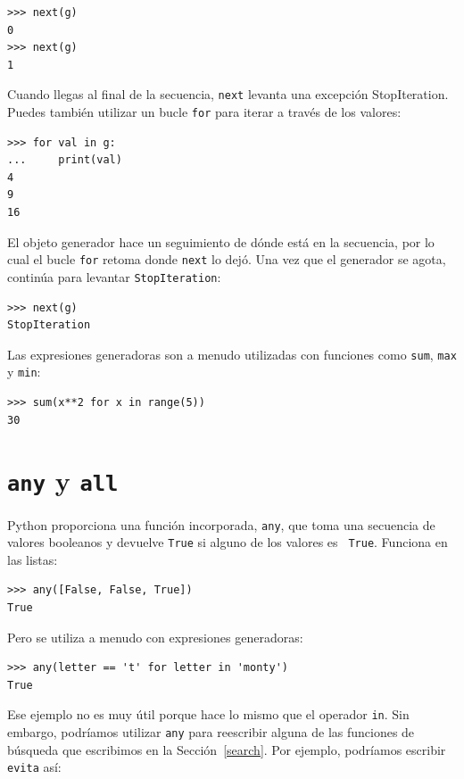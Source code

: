 \documentclass[10pt]{book}
\begin{document}
\begin{verbatim}
>>> next(g)
0
>>> next(g)
1
\end{verbatim}
%
Cuando llegas al final de la secuencia, {\tt next} levanta una
excepción StopIteration.  Puedes también utilizar un bucle {\tt for} para iterar
a través de los valores:

\begin{verbatim}
>>> for val in g:
...     print(val)
4
9
16
\end{verbatim}
%
El objeto generador hace un seguimiento de dónde está en la secuencia,
por lo cual el bucle {\tt for} retoma donde {\tt next} lo dejó.  Una vez que el
generador se agota, continúa para levantar {\tt StopIteration}:

\begin{verbatim}
>>> next(g)
StopIteration
\end{verbatim}

Las expresiones generadoras son a menudo utilizadas con funciones como {\tt sum},
{\tt max} y {\tt min}:

\begin{verbatim}
>>> sum(x**2 for x in range(5))
30
\end{verbatim}


\section{{\tt any} y {\tt all}}

Python proporciona una función incorporada, {\tt any}, que toma una secuencia
de valores booleanos y devuelve {\tt True} si alguno de los valores es {\tt
  True}.  Funciona en las listas:

\begin{verbatim}
>>> any([False, False, True])
True
\end{verbatim}
%
Pero se utiliza a menudo con expresiones generadoras:

\begin{verbatim}
>>> any(letter == 't' for letter in 'monty')
True
\end{verbatim}
%
Ese ejemplo no es muy útil porque hace lo mismo que
el operador {\tt in}.  Sin embargo, podríamos utilizar {\tt any} para reescribir
alguna de las funciones de búsqueda que escribimos en la Sección~\ref{search}.  Por
ejemplo, podríamos escribir {\tt evita} así:
\end{document}
